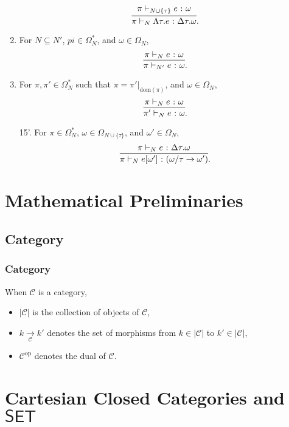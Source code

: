 \begin{frame}[allowframebreaks]
\begin{enumerate}
        \[
        \infer{\pi \vdash_N \Lambda\tau. e \colon \Delta\tau. \omega}{\pi \vdash_{N \cup \{\tau\}} e \colon \omega}.
        \]
        \item For $N \subseteq N'$, $pi \in \Omega^*_N$, and $\omega \in \Omega_N$,
        \[
        \infer{\pi \vdash_{N'} e \colon \omega}{\pi \vdash_N e \colon \omega}.
        \]
        \item For $\pi, \pi' \in \Omega^*_N$ such that $\pi = \pi'|_{\mathrm{dom}(\pi)}$, and $\omega \in \Omega_N$,
        \[
        \infer{\pi' \vdash_N e \colon \omega}{\pi \vdash_N e \colon \omega}.
        \]
    \end{enumerate}
    
    \begin{itemize}
        \item [15'.] For $\pi \in \Omega^*_N$, $\omega \in \Omega_{N \cup \{\tau\}}$, and $\omega' \in \Omega_N$,
        \[
        \infer{\pi \vdash_N e[\omega'] \colon (\omega / \tau \rightarrow \omega')}{\pi \vdash_N e \colon \Delta\tau.\omega}.
        \]
    \end{itemize}
\end{frame}

\section{Mathematical Preliminaries}

\subsection{Category}

\begin{frame}[fragile]
    \frametitle{Category}
    
    When $\mathcal{C}$ is a category,
    \begin{itemize}
        \item $|\mathcal{C}|$ is the collection of objects of $\mathcal{C}$,
        \item $k \xrightarrow[\mathcal{C}]{} k'$ denotes the set of morphisms from $k \in |\mathcal{C}|$ to $k' \in |\mathcal{C}|$,
        \item $\mathcal{C}^{\mathrm{op}}$ denotes the dual of $\mathcal{C}$.
    \end{itemize}
\end{frame}

\section{Cartesian Closed Categories and $\mathsf{SET}$}

